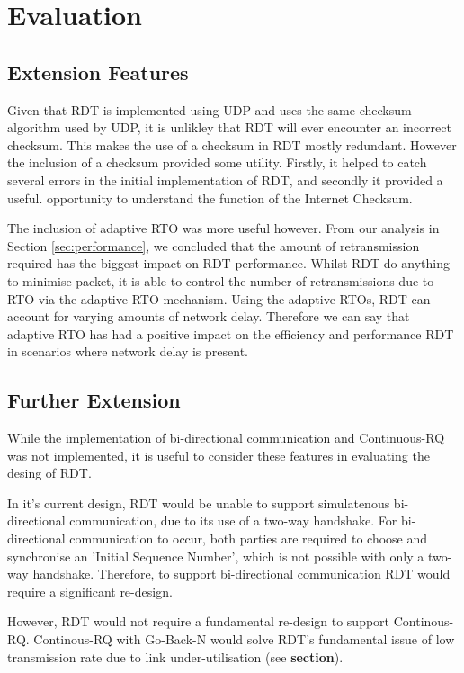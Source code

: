 \section{Evaluation}
\subsection{Extension Features}

Given that RDT is implemented using UDP and uses the same checksum algorithm used by UDP, it is unlikley that RDT will ever encounter an incorrect checksum. This makes the use of a checksum in RDT mostly redundant. However the inclusion of a checksum provided some utility. Firstly, it helped to catch several errors in the initial implementation of RDT, and secondly it provided a useful. opportunity to understand the function of the Internet Checksum.

The inclusion of adaptive RTO was more useful however. From our analysis in Section \ref{sec:performance}, we concluded that the amount of retransmission required has the biggest impact on RDT performance. Whilst RDT do anything to minimise packet, it is able to control the number of retransmissions due to RTO via the adaptive RTO mechanism. Using the adaptive RTOs, RDT can account for varying amounts of network delay. Therefore we can say that adaptive RTO has had a positive impact on the efficiency and performance RDT in scenarios where network delay is present.

\subsection{Further Extension}

While the implementation of bi-directional communication and Continuous-RQ was not implemented, it is useful to consider these features in evaluating the desing of RDT.

In it's current design, RDT would be unable to support simulatenous bi-directional communication, due to its use of a two-way handshake. For bi-directional communication to occur, both parties are required to choose and synchronise an 'Initial Sequence Number', which is not possible with only a two-way handshake. Therefore, to support bi-directional communication RDT would require a significant re-design.

However, RDT would not require a fundamental re-design to support Continous-RQ. Continous-RQ with Go-Back-N would solve RDT's fundamental issue of low transmission rate due to link under-utilisation (see \textbf{section}).